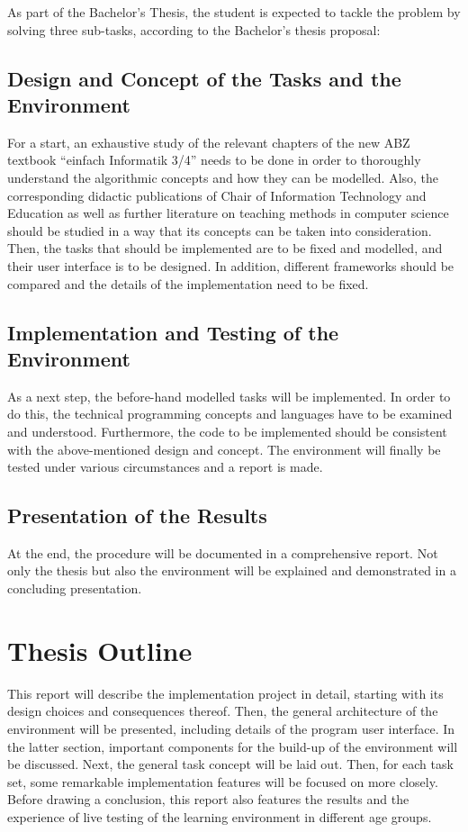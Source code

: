 As part of the Bachelor’s Thesis, the student is expected to tackle the problem by solving
three sub-tasks, according to the Bachelor's thesis proposal:

\subsection{Design and Concept of the Tasks and the Environment}
\label{subsection:t1}
For a start, an exhaustive study of the relevant chapters of the new ABZ textbook “einfach Informatik 3/4” needs to be done in order to thoroughly understand the algorithmic concepts and how they can be modelled. Also, the corresponding didactic publications of Chair of Information Technology and Education as well as further literature on teaching methods in computer science should be studied in a way that its concepts can be taken into consideration. Then, the tasks that should be implemented are to be fixed and modelled, and their user interface is to be designed. In addition,
different frameworks should be compared and the details of the implementation need to be fixed.

\subsection{Implementation and Testing of the Environment}
\label{subsection:t2}
As a next step, the before-hand modelled tasks will be implemented. In order to do this, the technical programming concepts and languages have to be examined and understood. Furthermore, the code to be implemented should be consistent with the above-mentioned design and concept. The environment will finally be tested under various circumstances and a report is made.

\subsection{Presentation of the Results}
\label{subsection:t3}
At the end, the procedure will be documented in a comprehensive report. Not only the thesis but also the environment will be explained and demonstrated in a concluding presentation.

\newpage
\section{Thesis Outline}
This report will describe the implementation project in detail, starting with its design choices and consequences thereof. Then, the general architecture of the environment will be presented, including details of the program user interface. In the latter section, important components for the build-up of the environment will be discussed. Next, the general task concept will be laid out. Then, for each task set, some remarkable implementation features will be focused on more closely. Before drawing a conclusion, this report also features the results and the experience of live testing of the learning environment in different age groups.



